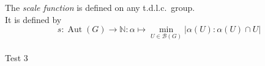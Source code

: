 \documentclass[preview]{standalone}
\begin{document}
The \textit{scale function} is defined on any t.d.l.c.\ group.\\It is defined by \[ s : \operatorname{Aut}(G) \to \mathbb{N} : \alpha \mapsto \min_{U \in \mathscr{B}(G)} |\alpha(U) : \alpha(U) \cap U | \]\\Test 3\\
\end{document}
